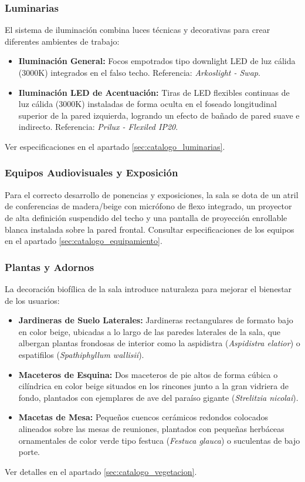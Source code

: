 \documentclass[12pt,a4paper]{article}
\begin{document}
\subsubsection{Luminarias}
El sistema de iluminación combina luces técnicas y decorativas para crear diferentes ambientes de trabajo:
\begin{itemize}
    \item \textbf{Iluminación General:} Focos empotrados tipo downlight LED de luz cálida (3000K) integrados en el falso techo. Referencia: \textit{Arkoslight - Swap}.
    \item \textbf{Iluminación LED de Acentuación:} Tiras de LED flexibles continuas de luz cálida (3000K) instaladas de forma oculta en el foseado longitudinal superior de la pared izquierda, logrando un efecto de bañado de pared suave e indirecto. Referencia: \textit{Prilux - Flexiled IP20}.
\end{itemize}
Ver especificaciones en el apartado \ref{sec:catalogo_luminarias}.

\subsubsection{Equipos Audiovisuales y Exposición}
Para el correcto desarrollo de ponencias y exposiciones, la sala se dota de un atril de conferencias de madera/beige con micrófono de flexo integrado, un proyector de alta definición suspendido del techo y una pantalla de proyección enrollable blanca instalada sobre la pared frontal. Consultar especificaciones de los equipos en el apartado \ref{sec:catalogo_equipamiento}.

\subsubsection{Plantas y Adornos}
La decoración biofílica de la sala introduce naturaleza para mejorar el bienestar de los usuarios:
\begin{itemize}
    \item \textbf{Jardineras de Suelo Laterales:} Jardineras rectangulares de formato bajo en color beige, ubicadas a lo largo de las paredes laterales de la sala, que albergan plantas frondosas de interior como la aspidistra (\textit{Aspidistra elatior}) o espatifilos (\textit{Spathiphyllum wallisii}).
    \item \textbf{Maceteros de Esquina:} Dos maceteros de pie altos de forma cúbica o cilíndrica en color beige situados en los rincones junto a la gran vidriera de fondo, plantados con ejemplares de ave del paraíso gigante (\textit{Strelitzia nicolai}).
    \item \textbf{Macetas de Mesa:} Pequeños cuencos cerámicos redondos colocados alineados sobre las mesas de reuniones, plantados con pequeñas herbáceas ornamentales de color verde tipo festuca (\textit{Festuca glauca}) o suculentas de bajo porte.
\end{itemize}
Ver detalles en el apartado \ref{sec:catalogo_vegetacion}.
\end{document}
